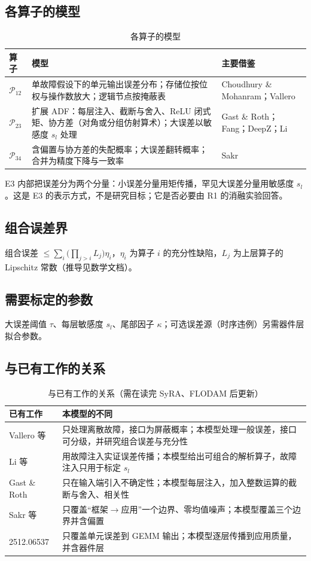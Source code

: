\documentclass[11pt,a4paper]{ctexart}
\begin{document}
\subsection{各算子的模型}
\begin{table}[h]
\centering
\small
\begin{tabularx}{\textwidth}{@{}lXX@{}}
\toprule
算子 & 模型 & 主要借鉴 \\
\midrule
$\mathcal P_{12}$ & 单故障假设下的单元输出误差分布；存储位按位权与操作数放大；逻辑节点按掩蔽表 & Choudhury \& Mohanram；Vallero \\
$\mathcal P_{23}$ & 扩展 ADF：每层注入、截断与舍入、ReLU 闭式矩、协方差（对角或分组仿射算术）；大误差以敏感度 $s_l$ 处理 & Gast \& Roth；Fang；DeepZ；Li \\
$\mathcal P_{34}$ & 含偏置与协方差的失配概率；大误差翻转概率；合并为精度下降与一致率 & Sakr \\
\bottomrule
\end{tabularx}
\caption{各算子的模型}
\end{table}

E3 内部把误差分为两个分量：小误差分量用矩传播，罕见大误差分量用敏感度 $s_l$。这是 E3 的表示方式，不是研究目标；它是否必要由 R1 的消融实验回答。

\subsection{组合误差界}
组合误差 $\le \sum_i\bigl(\prod_{j>i}L_j\bigr)\eta_i$，$\eta_i$ 为算子 $i$ 的充分性缺陷，$L_j$ 为上层算子的 Lipschitz 常数（推导见数学文档）。

\subsection{需要标定的参数}
大误差阈值 $\tau$、每层敏感度 $s_l$、尾部因子 $\kappa$；可选误差源（时序违例）另需器件层拟合参数。

\subsection{与已有工作的关系}
\begin{table}[h]
\centering
\small
\begin{tabularx}{\textwidth}{@{}lX@{}}
\toprule
已有工作 & 本模型的不同 \\
\midrule
Vallero 等 & 只处理离散故障，接口为屏蔽概率；本模型处理一般误差，接口可分级，并研究组合误差与充分性 \\
Li 等 & 用故障注入实证误差传播；本模型给出可组合的解析算子，故障注入只用于标定 $s_l$ \\
Gast \& Roth & 只在输入端引入不确定性；本模型每层注入，加入整数运算的截断与舍入、相关性 \\
Sakr 等 & 只覆盖“框架$\to$应用”一个边界、零均值噪声；本模型覆盖三个边界并含偏置 \\
2512.06537 & 只覆盖单元误差到 GEMM 输出；本模型逐层传播到应用质量，并含器件层 \\
\bottomrule
\end{tabularx}
\caption{与已有工作的关系（需在读完 SyRA、FLODAM 后更新）}
\end{table}
\end{document}
